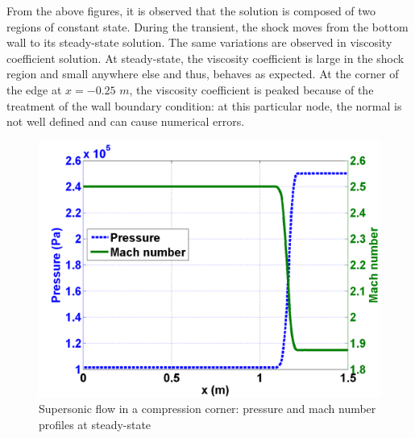 From the above figures, it is observed that the solution is composed of two regions of constant state. During the transient, the shock moves from the bottom wall to its steady-state solution. The same variations are observed in viscosity coefficient solution. At steady-state, the viscosity coefficient is large in the shock region and small anywhere else and thus, behaves as expected. At the corner of the edge at $x=-0.25$ $m$, the viscosity coefficient is peaked because of the treatment of the wall boundary condition: at this particular node, the normal is not well defined and can cause numerical errors. 
        \begin{figure}[H]%
                \centering
                \includegraphics[width=\textwidth]{figures/mach_number_pressure.png}
                \caption{Supersonic flow in a compression corner: pressure and mach number profiles at steady-state}
                \label{fig:2d_corner_isomach}
        \end{figure}        
